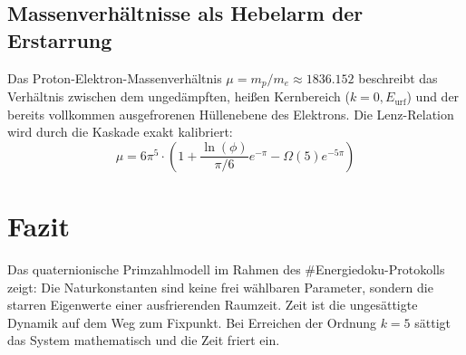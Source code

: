 \documentclass[11pt,a4paper]{article}
\begin{document}
\subsection{Massenverhältnisse als Hebelarm der Erstarrung}
Das Proton-Elektron-Massenverhältnis $\mu = m_p/m_e \approx 1836.152$ beschreibt das Verhältnis zwischen dem ungedämpften, heißen Kernbereich ($k=0, E_{\text{urf}}$) und der bereits vollkommen ausgefrorenen Hüllenebene des Elektrons. Die Lenz-Relation wird durch die Kaskade exakt kalibriert:
\begin{equation}
\mu = 6\pi^5 \cdot \left( 1 + \frac{\ln(\phi)}{\pi/6}e^{-\pi} - \Omega(5)e^{-5\pi} \right)
\end{equation}

\section{Fazit}
Das quaternionische Primzahlmodell im Rahmen des \#Energiedoku-Protokolls zeigt: Die Naturkonstanten sind keine frei wählbaren Parameter, sondern die starren Eigenwerte einer ausfrierenden Raumzeit. Zeit ist die ungesättigte Dynamik auf dem Weg zum Fixpunkt. Bei Erreichen der Ordnung $k=5$ sättigt das System mathematisch und die Zeit friert ein.
\end{document}
